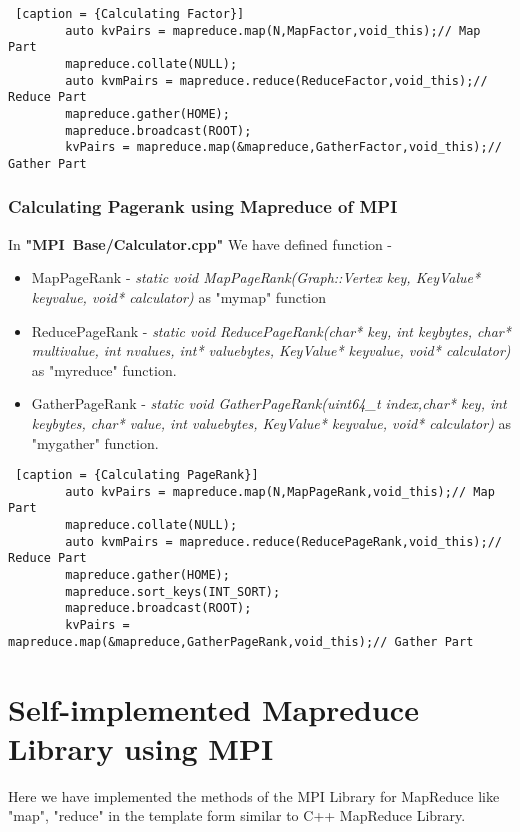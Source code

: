 \documentclass{article}
\begin{document}
    \begin{lstlisting} [caption = {Calculating Factor}]
        auto kvPairs = mapreduce.map(N,MapFactor,void_this);// Map Part
        mapreduce.collate(NULL);
        auto kvmPairs = mapreduce.reduce(ReduceFactor,void_this);// Reduce Part
        mapreduce.gather(HOME);
        mapreduce.broadcast(ROOT);
        kvPairs = mapreduce.map(&mapreduce,GatherFactor,void_this);// Gather Part
    \end{lstlisting}
    
    \subsubsection{Calculating Pagerank using Mapreduce of MPI}
    In \textbf{"MPI\ Base/Calculator.cpp"} We have defined function - 
    \begin{itemize}
        \item MapPageRank - \textit{static void MapPageRank(Graph::Vertex key, KeyValue* keyvalue, void* calculator)} as "mymap" function
        \item ReducePageRank - \textit{static void ReducePageRank(char* key, int keybytes, char* multivalue, int nvalues, int* valuebytes, KeyValue* keyvalue, void* calculator)} as "myreduce" function.
        \item GatherPageRank - \textit{static void GatherPageRank(uint64\_t index,char* key, int keybytes, char* value, int valuebytes, KeyValue* keyvalue, void* calculator)} as "mygather" function.
    \end{itemize}
    
    \begin{lstlisting} [caption = {Calculating PageRank}]
        auto kvPairs = mapreduce.map(N,MapPageRank,void_this);// Map Part
        mapreduce.collate(NULL);
        auto kvmPairs = mapreduce.reduce(ReducePageRank,void_this);// Reduce Part
        mapreduce.gather(HOME);
        mapreduce.sort_keys(INT_SORT);
        mapreduce.broadcast(ROOT);
        kvPairs = mapreduce.map(&mapreduce,GatherPageRank,void_this);// Gather Part
    \end{lstlisting}
    
    \clearpage
    
    \section{Self-implemented Mapreduce Library using MPI}
    Here we have implemented the methods of the MPI Library for MapReduce like "map", "reduce" in the template form similar to C++ MapReduce Library. \\
    
\end{document}
